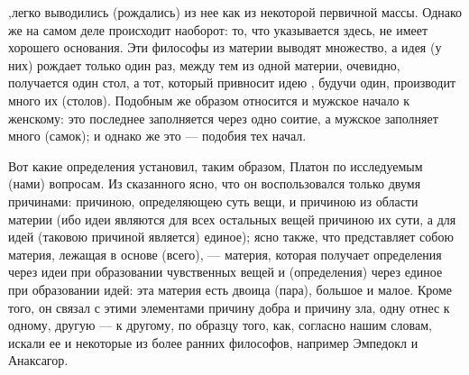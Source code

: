 \documentclass{article}
\begin{document}
\footnotemark[7]
,легко выводились (рождались) из нее как из некоторой первичной массы. Однако же на самом деле происходит наоборот: то, что указывается здесь, не имеет хорошего основания. Эти философы из материи выводят множество, а идея (у них) рождает только один раз, между тем из одной материи, очевидно, получается один стол, а тот, который привносит идею
\footnotemark[8]
, будучи один, производит много их (столов). Подобным же образом относится и мужское начало к женскому: это последнее заполняется через одно соитие, а мужское заполняет много (самок); и однако же это — подобия тех начал.
\footnotemark[9]

Вот какие определения установил, таким образом, Платон по исследуемым (нами) вопросам. Из сказанного ясно, что он воспользовался только двумя причинами: причиною, определяющею суть вещи, и причиною из области материи (ибо идеи являются для всех остальных вещей причиною их сути, а для идей (таковою причиной является) единое); ясно также, что представляет собою материя, лежащая в основе (всего), — материя, которая получает определения через идеи при образовании чувственных вещей и (определения) через единое при образовании идей: эта материя есть двоица (пара), большое и малое. Кроме того, он связал с этими элементами
\footnotemark[10]
причину добра и причину зла, одну отнес к одному, другую — к другому, по образцу того, как, согласно нашим словам, искали ее
\footnotemark[11]
и некоторые из более ранних философов, например Эмпедокл и Анаксагор.
\end{document}

